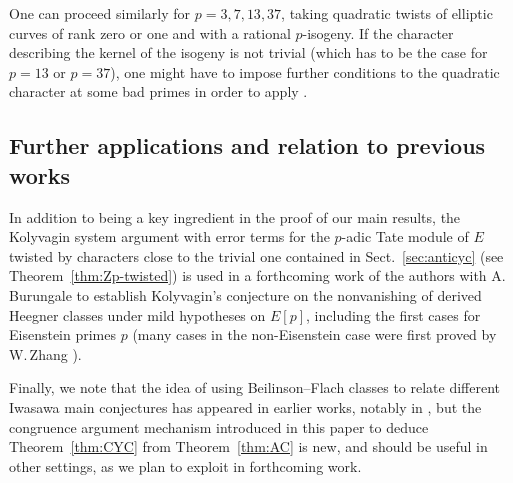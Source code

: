 \documentclass[a4paper,10pt]{amsart}
\numberwithin{equation}{section}
\numberwithin{equation}{section}
\theoremstyle{plain}
\theoremstyle{definition}
\theoremstyle{definition}
\theoremstyle{plain}
\theoremstyle{plain}
\theoremstyle{plain}
\theoremstyle{plain}
\begin{document}
One can proceed similarly for $p=3,7,13,37$, taking quadratic twists of elliptic curves of rank zero or one and with a rational $p$-isogeny. If the character describing the kernel of the isogeny is not trivial (which has to be the case for $p=13$ or $p=37$), one might have to impose further conditions to the quadratic character at some bad primes in order to apply \cite[Thm.~B]{twist}.


\subsection{Further applications and relation to previous works}

In addition to being a key ingredient in the proof of our main results, the Kolyvagin system argument with error terms for the $p$-adic Tate module of $E$ twisted by characters close to the trivial one 
contained in Sect.~\ref{sec:anticyc} (see Theorem~\ref{thm:Zp-twisted}) is used in a forthcoming work of the authors with A.\,Burungale \cite{BCGS} to establish Kolyvagin's conjecture on the nonvanishing of derived Heegner classes under  mild hypotheses on $E[p]$, including the first cases for  Eisenstein primes $p$ (many cases in the non-Eisenstein case were first proved by W.\,Zhang \cite{wei-zhang}).

Finally, we note that the idea of using Beilinson--Flach classes to relate different Iwasawa main conjectures has appeared in earlier works, notably in \cite{wan-ss,CW-adv}, but the congruence argument mechanism introduced in this paper to deduce Theorem~\ref{thm:CYC} from Theorem~\ref{thm:AC} is new, and should be useful in other settings, 
as we plan to exploit in forthcoming work. %



\end{document}
